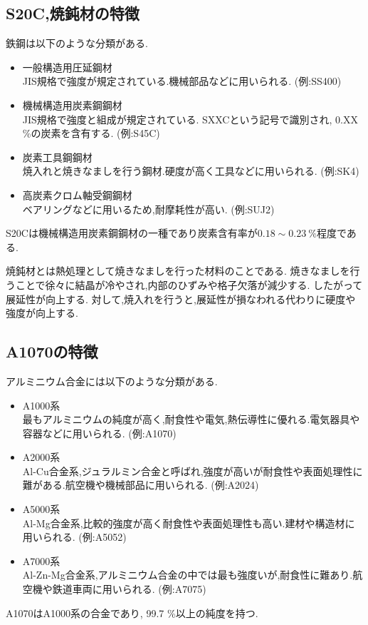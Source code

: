 \subsection{S20C,焼鈍材の特徴\cite{referen}\cite{misumi}}
鉄鋼は以下のような分類がある.
\begin{itemize}
  \item 一般構造用圧延鋼材\\JIS規格で強度が規定されている.機械部品などに用いられる. (例:SS400)
  \item 機械構造用炭素鋼鋼材\\JIS規格で強度と組成が規定されている. SXXCという記号で識別され, 0.XX \%の炭素を含有する. (例:S45C)
  \item 炭素工具鋼鋼材\\焼入れと焼きなましを行う鋼材.硬度が高く工具などに用いられる. (例:SK4)
  \item 高炭素クロム軸受鋼鋼材\\ベアリングなどに用いるため,耐摩耗性が高い. (例:SUJ2)
\end{itemize}
S20Cは機械構造用炭素鋼鋼材の一種であり炭素含有率が$0.18\sim0.23~\%$程度である.

焼鈍材とは熱処理として焼きなましを行った材料のことである.
焼きなましを行うことで徐々に結晶が冷やされ,内部のひずみや格子欠落が減少する.
したがって展延性が向上する.\cite{anies}
対して,焼入れを行うと,展延性が損なわれる代わりに硬度や強度が向上する.
\subsection{A1070の特徴\cite{misuim_al}}
アルミニウム合金には以下のような分類がある.
\begin{itemize}
  \item A1000系\\最もアルミニウムの純度が高く,耐食性や電気,熱伝導性に優れる.電気器具や容器などに用いられる. (例:A1070)
  \item A2000系\\Al-Cu合金系,ジュラルミン合金と呼ばれ,強度が高いが耐食性や表面処理性に難がある.航空機や機械部品に用いられる. (例:A2024)
  \item A5000系\\Al-Mg合金系,比較的強度が高く耐食性や表面処理性も高い.建材や構造材に用いられる. (例:A5052)
  \item A7000系\\Al-Zn-Mg合金系,アルミニウム合金の中では最も強度いが,耐食性に難あり.航空機や鉄道車両に用いられる. (例:A7075)
\end{itemize}
A1070はA1000系の合金であり, 99.7 \%以上の純度を持つ.
